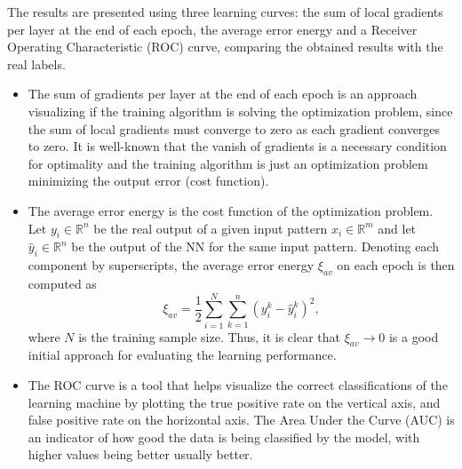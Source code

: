 \documentclass[conference]{IEEEtran}
\theoremstyle{definition}
\theoremstyle{remark}
\theoremstyle{remark}
\begin{document}
The results are presented using three learning curves: the sum of local
gradients per layer at the end of each epoch, the average error energy and a
Receiver Operating Characteristic (ROC) curve, comparing the obtained results
with the real labels.
\begin{itemize}
  \item The sum of gradients per layer at the end of each epoch is an approach
  visualizing if the training algorithm is solving the optimization problem,
  since the sum of local gradients must converge to zero as each gradient
  converges to zero. It is well-known that the vanish of gradients is a
  necessary condition for optimality and the training algorithm is just an
  optimization problem minimizing the output error (cost function).
  \item The average error energy is the cost function of the optimization
  problem. Let $y_i\in\mathbb{R}^n$ be the real output of a given input pattern
  $x_i\in\mathbb{R}^m$ and let $\hat{y}_i\in\mathbb{R}^n$ be the output of the
  NN for the same input pattern. Denoting each component by superscripts, the
  average error energy $\xi_{av}$ on each epoch is then computed as
\begin{equation}
\xi_{av}=\dfrac{1}{2}\sum_{i=1}^{N}\sum_{k=1}^n\left(y^k_i-\hat{y}^k_i\right)^2,
\end{equation}
  where $N$ is the training sample size. Thus, it is clear that
  $\xi_{av}\rightarrow0$ is a good initial approach for evaluating the
  learning performance.
  \item The ROC curve is a tool that helps visualize the correct classifications
  of the learning machine by plotting the true positive rate on the vertical
  axis, and false positive rate on the horizontal axis. The Area Under the Curve
  (AUC) is an indicator of how good the data is being classified by the model,
  with higher values being better usually better.
\end{itemize}
\end{document}
